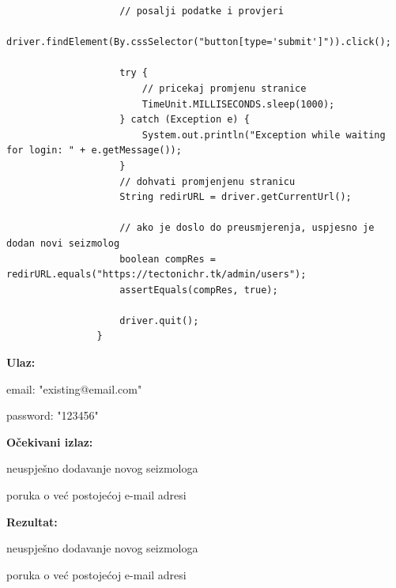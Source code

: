 \begin{lstlisting}
					// posalji podatke i provjeri
					driver.findElement(By.cssSelector("button[type='submit']")).click();
					
					try {
						// pricekaj promjenu stranice
						TimeUnit.MILLISECONDS.sleep(1000);
					} catch (Exception e) {
						System.out.println("Exception while waiting for login: " + e.getMessage());
					}
					// dohvati promjenjenu stranicu
					String redirURL = driver.getCurrentUrl();

					// ako je doslo do preusmjerenja, uspjesno je dodan novi seizmolog
					boolean compRes = redirURL.equals("https://tectonichr.tk/admin/users");
					assertEquals(compRes, true);
					
					driver.quit();
				}
			 \end{lstlisting}

			 \noindent {}
			 \begin{packed_item}

				 \item \textbf{Ulaz:}

				 \item[] \begin{packed_enum}
					\item email: "existing@email.com"
					\item password: "123456"
				\end{packed_enum}

				  \item \textbf{Očekivani izlaz:}

				 \item[] \begin{packed_enum}
					\item neuspješno dodavanje novog seizmologa
					\item poruka o već postojećoj e-mail adresi
				\end{packed_enum}
				 
				\item \textbf{Rezultat:}

				\item[] \begin{packed_enum}
					\item neuspješno dodavanje novog seizmologa
					\item poruka o već postojećoj e-mail adresi
			   \end{packed_enum}

			 \end{packed_item}
